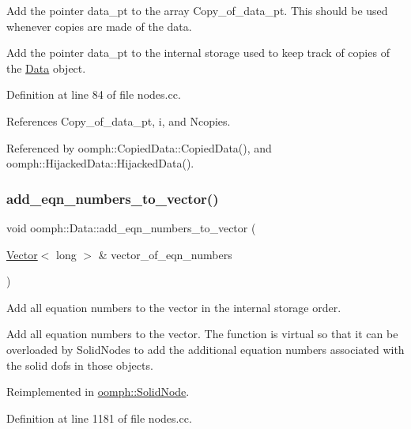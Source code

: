 Add the pointer data\+\_\+pt to the array Copy\+\_\+of\+\_\+data\+\_\+pt. This should be used whenever copies are made of the data. 

Add the pointer data\+\_\+pt to the internal storage used to keep track of copies of the \hyperlink{classoomph_1_1Data}{Data} object. 

Definition at line 84 of file nodes.\+cc.



References Copy\+\_\+of\+\_\+data\+\_\+pt, i, and Ncopies.



Referenced by oomph\+::\+Copied\+Data\+::\+Copied\+Data(), and oomph\+::\+Hijacked\+Data\+::\+Hijacked\+Data().

\mbox{\label{classoomph_1_1Data_a1d3f7c4200506d11fea3c647fe498f5d}} 
\subsubsection{\texorpdfstring{add\+\_\+eqn\+\_\+numbers\+\_\+to\+\_\+vector()}{add\_eqn\_numbers\_to\_vector()}}
{\footnotesize\ttfamily void oomph\+::\+Data\+::add\+\_\+eqn\+\_\+numbers\+\_\+to\+\_\+vector (\begin{DoxyParamCaption}\item[{\hyperlink{classoomph_1_1Vector}{Vector}$<$ long $>$ \&}]{vector\+\_\+of\+\_\+eqn\+\_\+numbers }\end{DoxyParamCaption})\hspace{0.3cm}{\ttfamily [virtual]}}



Add all equation numbers to the vector in the internal storage order. 

Add all equation numbers to the vector. The function is virtual so that it can be overloaded by Solid\+Nodes to add the additional equation numbers associated with the solid dofs in those objects. 

Reimplemented in \hyperlink{classoomph_1_1SolidNode_ad875a778d7d3bc32a847d93f6698bce4}{oomph\+::\+Solid\+Node}.



Definition at line 1181 of file nodes.\+cc.



